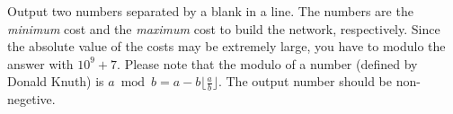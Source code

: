 Output two numbers separated by a blank in a line.
The numbers are the \emph{minimum} cost and the \emph{maximum} cost to build 
the network, respectively. 
Since the absolute value of the costs may be extremely large, you have to 
modulo the answer with $10^9 + 7$.
Please note that the modulo of a number (defined by Donald Knuth) is 
$a\bmod b = a - b \lfloor \frac a b \rfloor$. 
The output number should be non-negetive.
